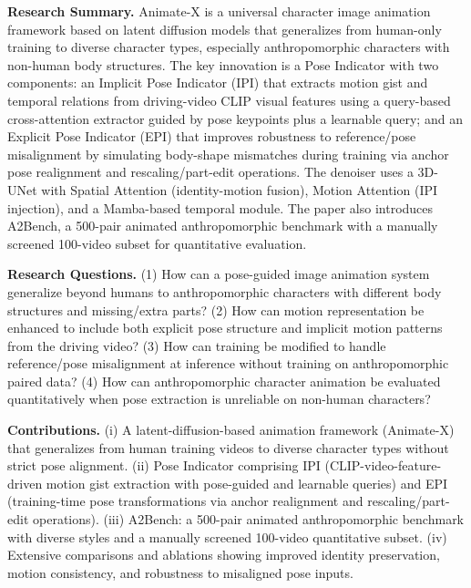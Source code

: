 \begin{tcolorbox}[
	title={Box 16: Case 3 --- Research Task Overview (Input)},
	colback=green!3!white,
	colframe=green!30!black,
	colbacktitle=green!15!white,
	coltitle=black,
	fonttitle=\bfseries,
	arc=3mm,
	boxrule=0.8pt,
	breakable
]
\small
\textbf{Research Summary.} Animate-X is a universal character image animation framework based on latent diffusion models that generalizes from human-only training to diverse character types, especially anthropomorphic characters with non-human body structures. The key innovation is a Pose Indicator with two components: an Implicit Pose Indicator (IPI) that extracts motion gist and temporal relations from driving-video CLIP visual features using a query-based cross-attention extractor guided by pose keypoints plus a learnable query; and an Explicit Pose Indicator (EPI) that improves robustness to reference/pose misalignment by simulating body-shape mismatches during training via anchor pose realignment and rescaling/part-edit operations. The denoiser uses a 3D-UNet with Spatial Attention (identity-motion fusion), Motion Attention (IPI injection), and a Mamba-based temporal module. The paper also introduces A2Bench, a 500-pair animated anthropomorphic benchmark with a manually screened 100-video subset for quantitative evaluation.

\smallskip
\textbf{Research Questions.} (1) How can a pose-guided image animation system generalize beyond humans to anthropomorphic characters with different body structures and missing/extra parts? (2) How can motion representation be enhanced to include both explicit pose structure and implicit motion patterns from the driving video? (3) How can training be modified to handle reference/pose misalignment at inference without training on anthropomorphic paired data? (4) How can anthropomorphic character animation be evaluated quantitatively when pose extraction is unreliable on non-human characters?

\smallskip
\textbf{Contributions.} (i) A latent-diffusion-based animation framework (Animate-X) that generalizes from human training videos to diverse character types without strict pose alignment. (ii) Pose Indicator comprising IPI (CLIP-video-feature-driven motion gist extraction with pose-guided and learnable queries) and EPI (training-time pose transformations via anchor realignment and rescaling/part-edit operations). (iii) A2Bench: a 500-pair animated anthropomorphic benchmark with diverse styles and a manually screened 100-video quantitative subset. (iv) Extensive comparisons and ablations showing improved identity preservation, motion consistency, and robustness to misaligned pose inputs.


\end{tcolorbox}
